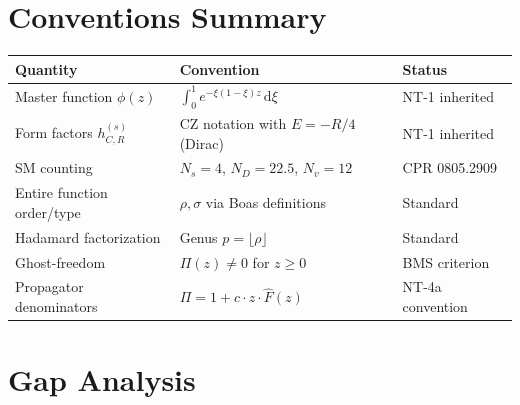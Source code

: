 \documentclass[12pt,a4paper]{article}
\theoremstyle{definition}
\theoremstyle{remark}
\newcommand{\dd}{\mathrm{d}}
\begin{document}
\section{Conventions Summary}
\label{sec:summary}

\begin{center}
\begin{tabular}{lll}
\toprule
Quantity & Convention & Status \\
\midrule
Master function $\phi(z)$ & $\int_0^1 e^{-\xi(1-\xi)z}\,\dd\xi$
  & NT-1 inherited \\
Form factors $h_{C,R}^{(s)}$ & CZ notation with $E = -R/4$ (Dirac)
  & NT-1 inherited \\
SM counting & $N_s=4$, $N_D=22.5$, $N_v=12$
  & CPR 0805.2909 \\
Entire function order/type & $\rho,\sigma$ via Boas definitions
  & Standard \\
Hadamard factorization & Genus $p = \lfloor\rho\rfloor$
  & Standard \\
Ghost-freedom & $\Pi(z) \neq 0$ for $z \geq 0$
  & BMS criterion \\
Propagator denominators & $\Pi = 1 + c\cdot z\cdot\hat{F}(z)$
  & NT-4a convention \\
\bottomrule
\end{tabular}
\end{center}


\section{Gap Analysis}
\label{sec:gaps}
\end{document}
